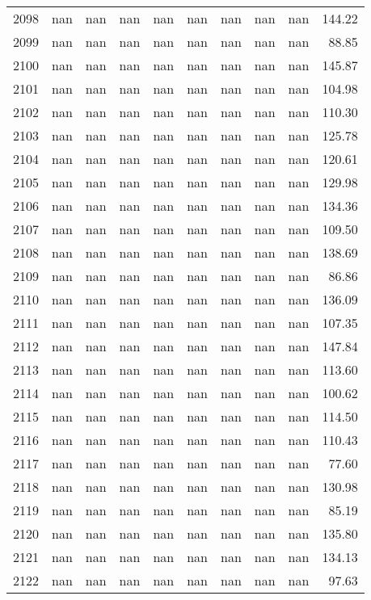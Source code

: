 \begin{tabular}{lrrrrrrrrr}
2098 & nan & nan & nan & nan & nan & nan & nan & nan & 144.22 \\
2099 & nan & nan & nan & nan & nan & nan & nan & nan & 88.85 \\
2100 & nan & nan & nan & nan & nan & nan & nan & nan & 145.87 \\
2101 & nan & nan & nan & nan & nan & nan & nan & nan & 104.98 \\
2102 & nan & nan & nan & nan & nan & nan & nan & nan & 110.30 \\
2103 & nan & nan & nan & nan & nan & nan & nan & nan & 125.78 \\
2104 & nan & nan & nan & nan & nan & nan & nan & nan & 120.61 \\
2105 & nan & nan & nan & nan & nan & nan & nan & nan & 129.98 \\
2106 & nan & nan & nan & nan & nan & nan & nan & nan & 134.36 \\
2107 & nan & nan & nan & nan & nan & nan & nan & nan & 109.50 \\
2108 & nan & nan & nan & nan & nan & nan & nan & nan & 138.69 \\
2109 & nan & nan & nan & nan & nan & nan & nan & nan & 86.86 \\
2110 & nan & nan & nan & nan & nan & nan & nan & nan & 136.09 \\
2111 & nan & nan & nan & nan & nan & nan & nan & nan & 107.35 \\
2112 & nan & nan & nan & nan & nan & nan & nan & nan & 147.84 \\
2113 & nan & nan & nan & nan & nan & nan & nan & nan & 113.60 \\
2114 & nan & nan & nan & nan & nan & nan & nan & nan & 100.62 \\
2115 & nan & nan & nan & nan & nan & nan & nan & nan & 114.50 \\
2116 & nan & nan & nan & nan & nan & nan & nan & nan & 110.43 \\
2117 & nan & nan & nan & nan & nan & nan & nan & nan & 77.60 \\
2118 & nan & nan & nan & nan & nan & nan & nan & nan & 130.98 \\
2119 & nan & nan & nan & nan & nan & nan & nan & nan & 85.19 \\
2120 & nan & nan & nan & nan & nan & nan & nan & nan & 135.80 \\
2121 & nan & nan & nan & nan & nan & nan & nan & nan & 134.13 \\
2122 & nan & nan & nan & nan & nan & nan & nan & nan & 97.63 \\

\end{tabular}
